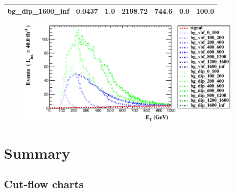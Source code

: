 \documentclass[a4paper, 10pt]{article}
\begin{document}
\begin{table}[H]
\begin{center}
\begin{tabular}{|m{23.0mm}|m{23.0mm}|m{18.0mm}|m{19.0mm}|m{19.0mm}|m{19.0mm}|m{19.0mm}|}
      \hline
      {\cellcolor{white}         bg\_dip\_1600\_inf}& {\cellcolor{white}         0.0437}& {\cellcolor{white}         1.0}& {\cellcolor{white}         2198.72}& {\cellcolor{white}         744.6}& {\cellcolor{red}         0.0}& {\cellcolor{red}         100.0}\\
\hline
    \end{tabular}
  \end{center}
\end{table}

\begin{figure}[H]
  \begin{center}
    \includegraphics[scale=0.45]{selection_15.eps}\\
\caption{   }
  \end{center}
\end{figure}
\newpage
\section{ Summary}

\subsection{Cut-flow charts}
\end{document}
